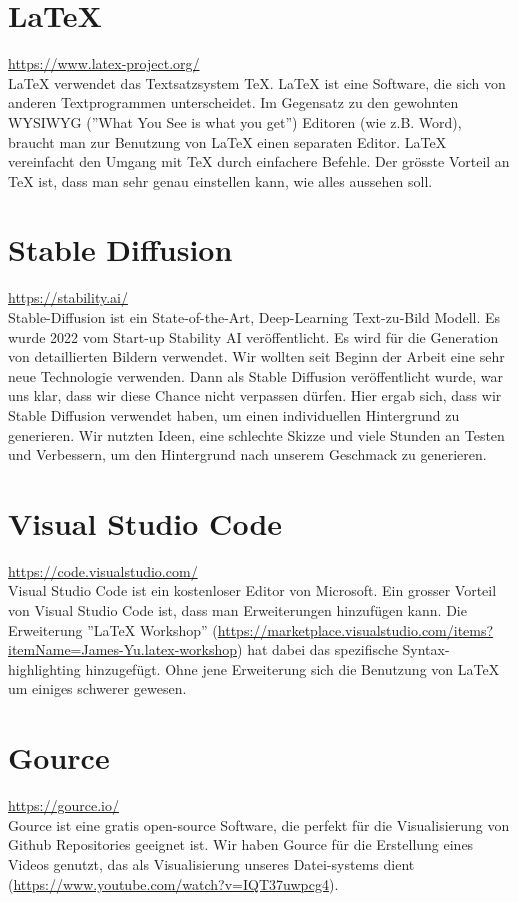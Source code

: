 \section{LaTeX}
\url{https://www.latex-project.org/}\\
LaTeX verwendet das Textsatzsystem TeX. LaTeX ist eine Software, die sich von anderen Textprogrammen unterscheidet. Im Gegensatz zu den gewohnten WYSIWYG (''What You See is what you get'') Editoren (wie z.B. Word),
braucht man zur Benutzung von LaTeX einen separaten Editor. LaTeX vereinfacht den Umgang mit TeX durch einfachere Befehle. Der grösste Vorteil an TeX ist, dass man sehr genau einstellen kann, wie alles aussehen soll.


\section{Stable Diffusion}
\url{https://stability.ai/}\\
Stable-Diffusion ist ein State-of-the-Art, Deep-Learning Text-zu-Bild Modell. Es wurde 2022 vom Start-up Stability AI veröffentlicht. Es wird für die Generation von detaillierten Bildern verwendet. Wir wollten seit
Beginn der Arbeit eine sehr neue Technologie verwenden. Dann als Stable Diffusion veröffentlicht wurde, war uns klar, dass wir diese Chance nicht verpassen dürfen. Hier ergab sich, dass wir Stable Diffusion verwendet haben, um einen individuellen
Hintergrund zu generieren. Wir nutzten Ideen, eine schlechte Skizze und viele Stunden an Testen und Verbessern, um den Hintergrund nach unserem Geschmack zu generieren.

\section{Visual Studio Code}
\url{https://code.visualstudio.com/}\\
Visual Studio Code ist ein kostenloser Editor von Microsoft. Ein grosser Vorteil von Visual Studio Code ist, dass man Erweiterungen hinzufügen kann. Die Erweiterung ''LaTeX Workshop'' (\url{https://marketplace.visualstudio.com/items?itemName=James-Yu.latex-workshop})
hat dabei das spezifische Syntax-highlighting hinzugefügt. Ohne jene Erweiterung sich die Benutzung von LaTeX um einiges schwerer gewesen.

\section{Gource}
\url{https://gource.io/}\\
Gource ist eine gratis open-source Software, die perfekt für die Visualisierung von Github Repositories geeignet ist. Wir haben Gource für die Erstellung eines Videos genutzt, das als Visualisierung unseres Datei-systems
dient (\url{https://www.youtube.com/watch?v=IQT37uwpcg4}).

